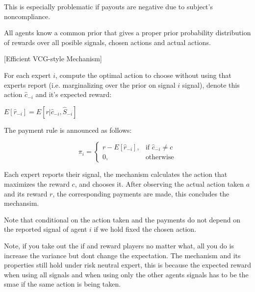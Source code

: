 This is especially problematic if payouts are negative due to subject's noncompliance.

All agents know a common prior that gives a proper prior probability distribution of rewards over all posible signals, chosen actions and actual actions.

\begin{mech}\label{mech:vcg-style}[Efficient VCG-style Mechanism]



For each expert $i$, compute the optimal action to choose without using that experts report (i.e. marginalizing over the prior on signal $i$ signal), denote this action $\hat{c}_{-i}$ and it's expected reward:

$E[\hat{r}_{-i}] = E[ r| \hat{c}_{-i}, \hat{S}_{-i}] $


 The payment rule is announced as follows:

\[
    \pi_i = 
\begin{cases}
    r - E[\hat{r}_{-i}] ,& \text{if } \hat{c}_{-i} \neq c\\
    0,              & \text{otherwise}
\end{cases}
\]

%

Each expert reports their signal, the mechanism calculates the action that maximizes the reward $c$, and chooses it. After observing the actual action taken $a$ and its reward $r$, the corresponding payments are made, this concludes the mechansim.

Note that conditional on the action taken and the payments do not depend on the reported signal of agent $i$ if we hold fixed the chosen action. 

\end{mech}

Note, if you take out the if and reward players no matter what, all you do is increase the variance but dont change the expectation. The  mechanism and its properties still hold under risk neutral expert,  this is because the expected reward when using all signals and when using only the other agents signals has to be the smae if the same action is being taken. 


